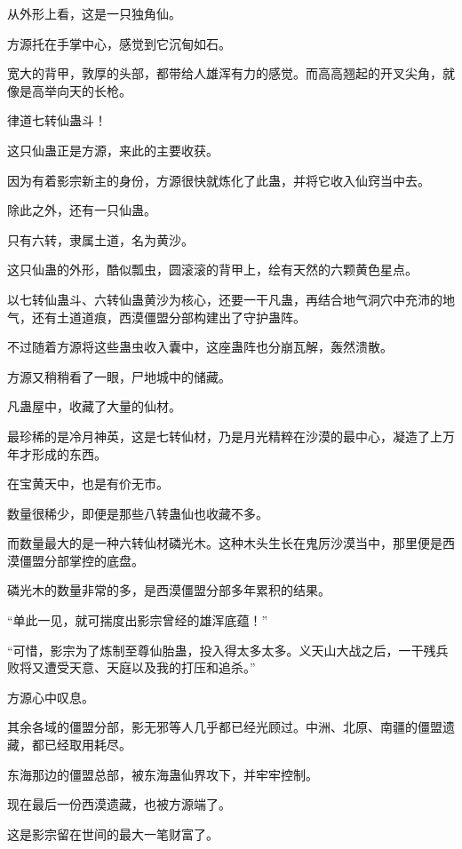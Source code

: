 
\begin{this_body}

从外形上看，这是一只独角仙。

方源托在手掌中心，感觉到它沉甸如石。

宽大的背甲，敦厚的头部，都带给人雄浑有力的感觉。而高高翘起的开叉尖角，就像是高举向天的长枪。

律道七转仙蛊斗！

这只仙蛊正是方源，来此的主要收获。

因为有着影宗新主的身份，方源很快就炼化了此蛊，并将它收入仙窍当中去。

除此之外，还有一只仙蛊。

只有六转，隶属土道，名为黄沙。

这只仙蛊的外形，酷似瓢虫，圆滚滚的背甲上，绘有天然的六颗黄色星点。

以七转仙蛊斗、六转仙蛊黄沙为核心，还要一干凡蛊，再结合地气洞穴中充沛的地气，还有土道道痕，西漠僵盟分部构建出了守护蛊阵。

不过随着方源将这些蛊虫收入囊中，这座蛊阵也分崩瓦解，轰然溃散。

方源又稍稍看了一眼，尸地城中的储藏。

凡蛊屋中，收藏了大量的仙材。

最珍稀的是冷月神英，这是七转仙材，乃是月光精粹在沙漠的最中心，凝造了上万年才形成的东西。

在宝黄天中，也是有价无市。

数量很稀少，即便是那些八转蛊仙也收藏不多。

而数量最大的是一种六转仙材磷光木。这种木头生长在鬼厉沙漠当中，那里便是西漠僵盟分部掌控的底盘。

磷光木的数量非常的多，是西漠僵盟分部多年累积的结果。

“单此一见，就可揣度出影宗曾经的雄浑底蕴！”

“可惜，影宗为了炼制至尊仙胎蛊，投入得太多太多。义天山大战之后，一干残兵败将又遭受天意、天庭以及我的打压和追杀。”

方源心中叹息。

其余各域的僵盟分部，影无邪等人几乎都已经光顾过。中洲、北原、南疆的僵盟遗藏，都已经取用耗尽。

东海那边的僵盟总部，被东海蛊仙界攻下，并牢牢控制。

现在最后一份西漠遗藏，也被方源端了。

这是影宗留在世间的最大一笔财富了。


\end{this_body}
